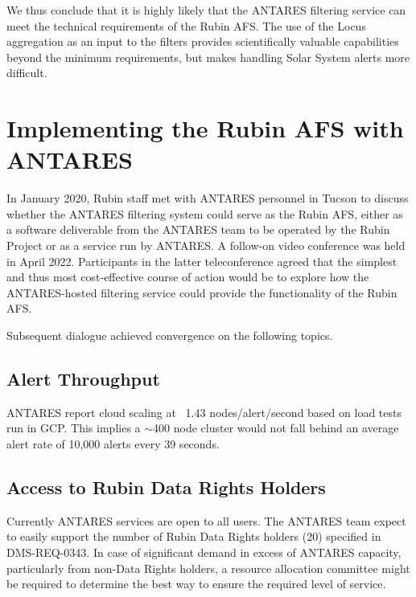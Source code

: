 \documentclass[DM,authoryear,toc]{lsstdoc}
\begin{document}
We thus conclude that it is highly likely that the ANTARES filtering service can meet the technical requirements of the Rubin AFS.
The use of the Locus aggregation as an input to the filters provides scientifically valuable capabilities beyond the minimum requirements, but makes handling Solar System alerts more difficult.



\section{Implementing the Rubin AFS with ANTARES} \label{sec:implementation}

In January 2020, Rubin staff 
met with ANTARES personnel %
in Tucson to discuss whether the ANTARES filtering system could serve as the Rubin AFS, either as a software deliverable from the ANTARES team to be operated by the Rubin Project or as a service run by ANTARES.
A follow-on video conference was held in April 2022.
Participants in the latter teleconference agreed that the simplest and thus most cost-effective course of action would be to explore how the ANTARES-hosted filtering service could provide the functionality of the Rubin AFS.

Subsequent dialogue achieved convergence on the following topics.

\subsection{Alert Throughput}

ANTARES report cloud scaling at ~1.43 nodes/alert/second based on load tests run in GCP.
This implies a $\sim$400 node cluster would not fall behind an average alert rate of 10,000 alerts every 39 seconds.

\subsection{Access to Rubin Data Rights Holders}

Currently ANTARES services are open to all users.  
The ANTARES team expect to easily support the number of Rubin Data Rights holders (20) specified in DMS-REQ-0343.
In case of significant demand in excess of ANTARES capacity, particularly from non-Data Rights holders, a resource allocation committee might be required to determine the best way to ensure the required level of service.
\end{document}
